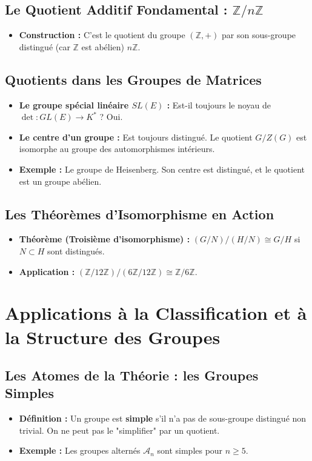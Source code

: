 \documentclass[12pt, a4paper, parskip=full]{report}
\theoremstyle{agregstyle}
\begin{document}
\subsection{Le Quotient Additif Fondamental : $\mathbb{Z}/n\mathbb{Z}$}
\begin{itemize}
    \item \textbf{Construction :} C'est le quotient du groupe $(\mathbb{Z}, +)$ par son sous-groupe distingué (car $\mathbb{Z}$ est abélien) $n\mathbb{Z}$.
\end{itemize}

\subsection{Quotients dans les Groupes de Matrices}
\begin{itemize}
    \item \textbf{Le groupe spécial linéaire $SL(E)$ :} Est-il toujours le noyau de $\det: GL(E) \to K^*$ ? Oui.
    \item \textbf{Le centre d'un groupe :} Est toujours distingué. Le quotient $G/Z(G)$ est isomorphe au groupe des automorphismes intérieurs.
    \item \textbf{Exemple :} Le groupe de Heisenberg. Son centre est distingué, et le quotient est un groupe abélien.
\end{itemize}

\subsection{Les Théorèmes d'Isomorphisme en Action}
\begin{itemize}
    \item \textbf{Théorème (Troisième d'isomorphisme) :} $(G/N)/(H/N) \cong G/H$ si $N \subset H$ sont distingués.
    \item \textbf{Application :} $(\mathbb{Z}/12\mathbb{Z}) / (6\mathbb{Z}/12\mathbb{Z}) \cong \mathbb{Z}/6\mathbb{Z}$.
\end{itemize}

\section{Applications à la Classification et à la Structure des Groupes}

\subsection{Les Atomes de la Théorie : les Groupes Simples}
\begin{itemize}
    \item \textbf{Définition :} Un groupe est \textbf{simple} s'il n'a pas de sous-groupe distingué non trivial. On ne peut pas le "simplifier" par un quotient.
    \item \textbf{Exemple :} Les groupes alternés $\mathcal{A}_n$ sont simples pour $n \geq 5$.
\end{itemize}
\end{document}
